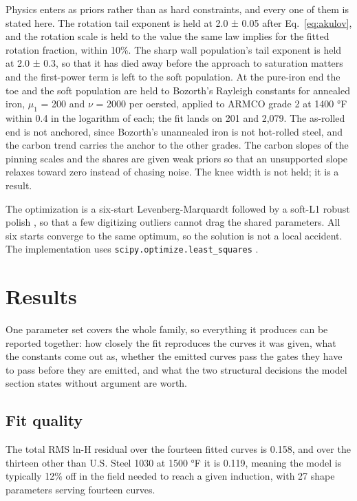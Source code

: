 \documentclass[
  11pt,
]{article}
\begin{document}
Physics enters as priors rather than as hard constraints, and every one of them is stated here. The rotation tail exponent is held at 2.0 ± 0.05 after Eq.~\eqref{eq:akulov}, and the rotation scale is held to the value the same law implies for the fitted rotation fraction, within 10\%. The sharp wall population's tail exponent is held at 2.0 ± 0.3, so that it has died away before the approach to saturation matters and the first-power term is left to the soft population. At the pure-iron end the toe and the soft population are held to Bozorth's Rayleigh constants for annealed iron, \(\mu_1\) = 200 and \(\nu\) = 2000 per oersted, applied to ARMCO grade 2 at 1400 °F within 0.4 in the logarithm of each; the fit lands on 201 and 2,079. The as-rolled end is not anchored, since Bozorth's unannealed iron is not hot-rolled steel, and the carbon trend carries the anchor to the other grades. The carbon slopes of the pinning scales and the shares are given weak priors so that an unsupported slope relaxes toward zero instead of chasing noise. The knee width is not held; it is a result.

The optimization is a six-start Levenberg-Marquardt \cite{wiki-lm} followed by a soft-L1 robust polish \cite{wiki-huber}, so that a few digitizing outliers cannot drag the shared parameters. All six starts converge to the same optimum, so the solution is not a local accident. The implementation uses \texttt{scipy.optimize.least\_squares} \cite{virtanen2020}.

\section{Results}\label{results}

One parameter set covers the whole family, so everything it produces can be reported together: how closely the fit reproduces the curves it was given, what the constants come out as, whether the emitted curves pass the gates they have to pass before they are emitted, and what the two structural decisions the model section states without argument are worth.

\subsection{Fit quality}\label{fit-quality}

The total RMS ln-H residual over the fourteen fitted curves is 0.158, and over the thirteen other than U.S. Steel 1030 at 1500 °F it is 0.119, meaning the model is typically 12\% off in the field needed to reach a given induction, with 27 shape parameters serving fourteen curves.
\end{document}
